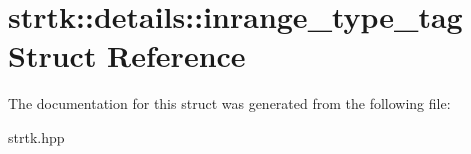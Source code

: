 \hypertarget{structstrtk_1_1details_1_1inrange__type__tag}{\section{strtk\-:\-:details\-:\-:inrange\-\_\-type\-\_\-tag Struct Reference}
\label{structstrtk_1_1details_1_1inrange__type__tag}
}


The documentation for this struct was generated from the following file\-:\begin{DoxyCompactItemize}
\item 
strtk.\-hpp\end{DoxyCompactItemize}
